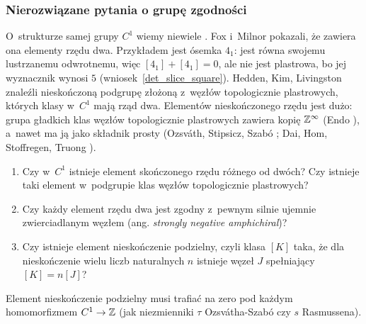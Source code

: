 \subsubsection{Nierozwiązane pytania o grupę zgodności}
O~strukturze samej grupy $C^1$ wiemy niewiele \cite[problem 1.38]{baykur2026}.
Fox i~Milnor \cite{fox1966} pokazali, że zawiera ona elementy rzędu dwa.
Przykładem jest ósemka $4_1$: jest równa swojemu lustrzanemu odwrotnemu, więc $[4_1] + [4_1] = 0$, ale nie jest plastrowa, bo jej wyznacznik wynosi $5$ (wniosek~\ref{det_slice_square}).
Hedden, Kim, Livingston \cite{hedden2016} znaleźli nieskończoną podgrupę złożoną z~węzłów topologicznie plastrowych, których klasy w~$C^1$ mają rząd dwa.
%
%
Elementów nieskończonego rzędu jest dużo: grupa gładkich klas węzłów topologicznie plastrowych zawiera kopię $\mathbb Z^\infty$ (Endo \cite{endo1995}), a~nawet ma ją jako składnik prosty (Ozsváth, Stipsicz, Szabó \cite{ozsvath2017}; Dai, Hom, Stoffregen, Truong \cite{dai2021}).
%
%
%

\begin{conjecture}
    \begin{enumerate}
        \item Czy w~$C^1$ istnieje element skończonego rzędu różnego od dwóch?
        Czy istnieje taki element w~podgrupie klas węzłów topologicznie plastrowych?
        \item Czy każdy element rzędu dwa jest zgodny z~pewnym silnie ujemnie zwierciadlanym węzłem (ang. \emph{strongly negative amphichiral})?
        \item Czy istnieje element nieskończenie podzielny, czyli klasa $[K]$ taka, że dla nieskończenie wielu liczb naturalnych $n$ istnieje węzeł $J$ spełniający $[K] = n [J]$?
    \end{enumerate}
\end{conjecture}

Element nieskończenie podzielny musi trafiać na zero pod każdym homomorfizmem $C^1 \to \mathbb Z$ (jak niezmienniki $\tau$ Ozsvátha-Szabó czy $s$ Rasmussena).

